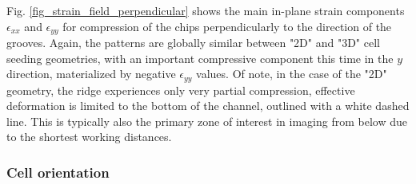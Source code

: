 \documentclass[11pt]{amsart}
\begin{document}
\begin{figure}
\end{figure}

Fig. \ref{fig_strain_field_perpendicular} shows the main in-plane strain components $\epsilon_{xx}$ and $\epsilon_{yy}$ for compression of the chips perpendicularly to the direction of the grooves. Again, the patterns are globally similar between "2D" and "3D" cell seeding geometries, with an important compressive component this time in the $y$ direction, materialized by negative $\epsilon_{yy}$ values. Of note, in the case of the "2D" geometry, the ridge experiences only very partial compression, effective deformation is limited to the bottom of the channel, outlined with a white dashed line. This is typically also the primary zone of interest in imaging from below due to the shortest working distances.

\subsubsection{Cell orientation}
\end{document}
